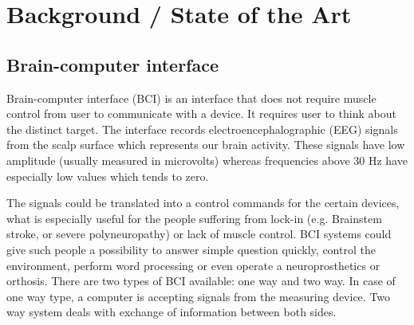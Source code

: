 \documentclass[12pt]{article}
\begin{document}
\newpage
\section{Background / State of the Art} 

\subsection{Brain-computer interface}

Brain-computer interface (BCI) is an interface that does not require muscle control from user to communicate with a device. It requires user to think about the distinct target. The interface records electroencephalographic (EEG) signals from the scalp surface which represents our brain activity. These signals have low amplitude (usually measured in microvolts) whereas frequencies above 30 Hz have especially low values which tends to zero.\cite{bci_vidal}

The signals could be translated into a control commands for the certain devices, what is especially useful for the people suffering from lock-in (e.g. Brainstem stroke, or severe polyneuropathy) or lack of muscle control.  BCI systems could give such people a possibility to answer simple question quickly, control the environment, perform word processing or even operate a neuroprosthetics or orthosis.
There are two types of BCI available: one way and two way. In case of one way type, a computer is accepting signals from the measuring device. Two way system deals with exchange of information between both sides.\cite{bci_shivangi}
\end{document}
